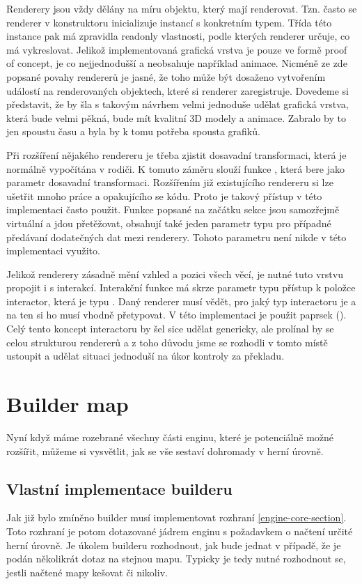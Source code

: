 Renderery jsou vždy dělány na míru objektu, který mají renderovat. Tzn. často se renderer v konstruktoru 
inicializuje instancí s konkretním typem. Třída této instance pak má zpravidla readonly vlastnosti,
podle kterých renderer určuje, co má vykreslovat. Jelikož implementovaná grafická vrstva je pouze ve formě proof of concept,
je co nejjednodušší a neobsahuje například animace. Nicméně ze zde popsané povahy rendererů je jasné, že 
toho může být dosaženo vytvořením událostí na renderovaných objektech, které si renderer zaregistruje.
Dovedeme si představit, že by šla s takovým návrhem velmi jednoduše udělat grafická vrstva, která bude
velmi pěkná, bude mít kvalitní 3D modely a animace. Zabralo by to jen spoustu času a byla by k tomu potřeba spousta grafiků.

Při rozšíření nějakého rendereru je třeba zjistit dosavadní transformaci, která je normálně vypočítána v rodiči.
K tomuto záměru slouží funkce , která bere jako parametr dosavadní transformaci.
Rozšířením již existujícího rendereru si lze ušetřit mnoho práce a opakujícího se kódu. Proto je takový přístup v této implementaci často použit.
Funkce popsané na začátku sekce jsou samozřejmě virtuální a jdou přetěžovat,
obsahují také jeden parametr typu  pro případné předávaní dodatečných dat mezi renderery. Tohoto parametru není nikde v této implementaci využito.

Jelikož renderery zásadně mění vzhled a pozici všech věcí, je nutné tuto vrstvu propojit i s interakcí.
Interakční funkce má skrze parametr typu   přístup k položce interactor, která je typu .
Daný renderer musí vědět, pro jaký typ interactoru je a na ten si ho musí vhodně přetypovat. V této implementaci je použit paprsek  (). 
Celý tento koncept interactoru by šel sice udělat genericky, ale prolínal by se celou strukturou rendererů a z toho
důvodu jsme se rozhodli v tomto místě ustoupit a udělat situaci jednoduší na úkor kontroly za překladu.

\section{Builder map}
Nyní když máme rozebrané všechny části enginu, které je potenciálně možné rozšířit, můžeme si vysvětlit, jak
se vše sestaví dohromady v herní úrovně.

\subsection{Vlastní implementace builderu}\label{custom-builder}
Jak již bylo zmíněno builder musí implementovat rozhraní  \vref{engine-core-section}. Toto rozhraní je
potom dotazované jádrem enginu s požadavkem o načtení určité herní úrovně. Je úkolem builderu rozhodnout, jak bude jednat
v případě, že je podán několikrát dotaz na stejnou mapu. Typicky je tedy nutné rozhodnout
se, jestli načtené mapy kešovat či nikoliv. 

